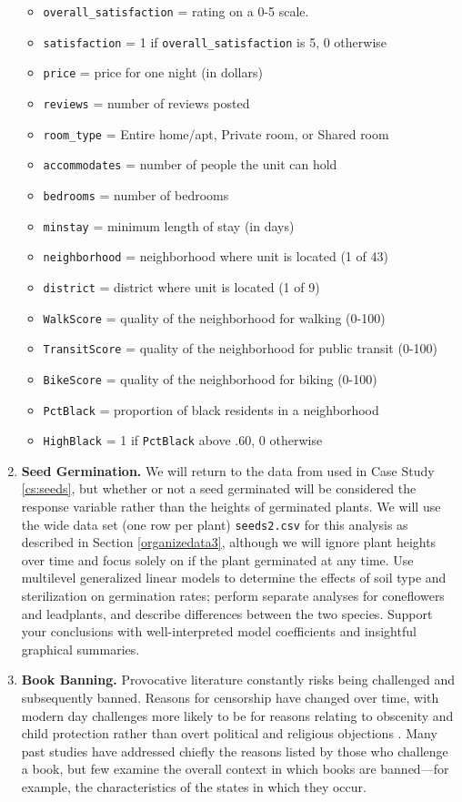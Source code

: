 \documentclass[
]{krantz}
\providecommand{\tightlist}{%
  \setlength{\itemsep}{0pt}\setlength{\parskip}{0pt}}
\begin{document}
\begin{enumerate}
  \begin{itemize}
  \tightlist
  \item
    \texttt{overall\_satisfaction} = rating on a 0-5 scale.
  \item
    \texttt{satisfaction} = 1 if \texttt{overall\_satisfaction} is 5, 0 otherwise
  \item
    \texttt{price} = price for one night (in dollars)
  \item
    \texttt{reviews} = number of reviews posted
  \item
    \texttt{room\_type} = Entire home/apt, Private room, or Shared room
  \item
    \texttt{accommodates} = number of people the unit can hold
  \item
    \texttt{bedrooms} = number of bedrooms
  \item
    \texttt{minstay} = minimum length of stay (in days)
  \item
    \texttt{neighborhood} = neighborhood where unit is located (1 of 43)
  \item
    \texttt{district} = district where unit is located (1 of 9)
  \item
    \texttt{WalkScore} = quality of the neighborhood for walking (0-100)
  \item
    \texttt{TransitScore} = quality of the neighborhood for public transit (0-100)
  \item
    \texttt{BikeScore} = quality of the neighborhood for biking (0-100)
  \item
    \texttt{PctBlack} = proportion of black residents in a neighborhood
  \item
    \texttt{HighBlack} = 1 if \texttt{PctBlack} above .60, 0 otherwise
  \end{itemize}
\item
  \textbf{Seed Germination.} We will return to the data from \citet{Angell2010} used in Case Study \ref{cs:seeds}, but whether or not a seed germinated will be considered the response variable rather than the heights of germinated plants. We will use the wide data set (one row per plant) \texttt{seeds2.csv} for this analysis as described in Section \ref{organizedata3}, although we will ignore plant heights over time and focus solely on if the plant germinated at any time. Use multilevel generalized linear models to determine the effects of soil type and sterilization on germination rates; perform separate analyses for coneflowers and leadplants, and describe differences between the two species. Support your conclusions with well-interpreted model coefficients and insightful graphical summaries.
\item
  \textbf{Book Banning.} Provocative literature constantly risks being challenged and subsequently banned. Reasons for censorship have changed over time, with modern day challenges more likely to be for reasons relating to obscenity and child protection rather than overt political and religious objections \citep{Jenkins2006}. Many past studies have addressed chiefly the reasons listed by those who challenge a book, but few examine the overall context in which books are banned---for example, the characteristics of the states in which they occur.


\end{enumerate}
\end{document}

